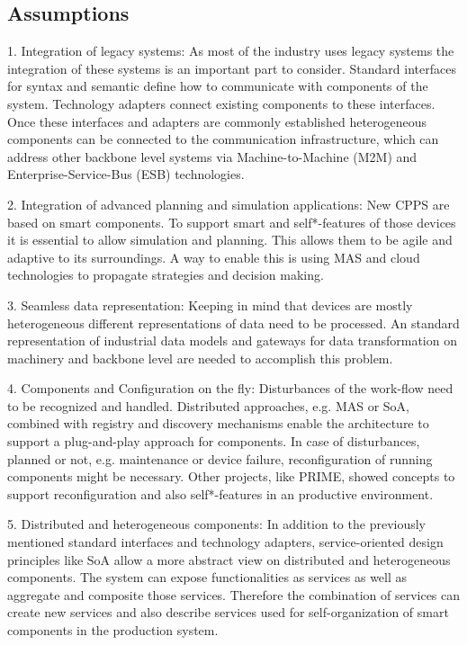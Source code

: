 \documentclass[conference,compsoc,hidelinks]{IEEEtran}
\begin{document}
\subsection{Assumptions}
1. Integration of legacy systems: As most of the industry uses legacy systems the integration of these systems is an important part to consider. Standard interfaces for syntax and semantic define how to communicate with components of the system. Technology adapters connect existing components to these interfaces. Once these interfaces and adapters are commonly established heterogeneous components can be connected to the communication infrastructure, which can address other backbone level systems via Machine-to-Machine (M2M) and Enterprise-Service-Bus (ESB) technologies.

2. Integration of advanced planning and simulation applications: New CPPS are based on smart components. To support smart and self*-features of those devices it is essential to allow simulation and planning. This allows them to be agile and adaptive to its surroundings. A way to enable this is using MAS and cloud technologies to propagate strategies and decision making.

3. Seamless data representation: Keeping in mind that devices are mostly heterogeneous different representations of data need to be processed. An standard representation of industrial data models and gateways for data transformation on machinery and backbone level are needed to accomplish this problem.

4. Components and Configuration on the fly: Disturbances of the work-flow need to be recognized and handled. Distributed approaches, e.g. MAS or SoA, combined with registry and discovery mechanisms enable the architecture to support a plug-and-play approach for components. In case of disturbances, planned or not, e.g. maintenance or device failure, reconfiguration of running components might be necessary. Other projects, like PRIME, showed concepts to support reconfiguration and also self*-features in an productive environment.

5. Distributed and heterogeneous components: In addition to the previously mentioned standard interfaces and technology adapters, service-oriented design principles like SoA allow a more abstract view on distributed and heterogeneous components. The system can expose functionalities as services as well as aggregate and composite those services. Therefore the combination of services can create new services and also describe services used for self-organization of smart components in the production system.
\end{document}

